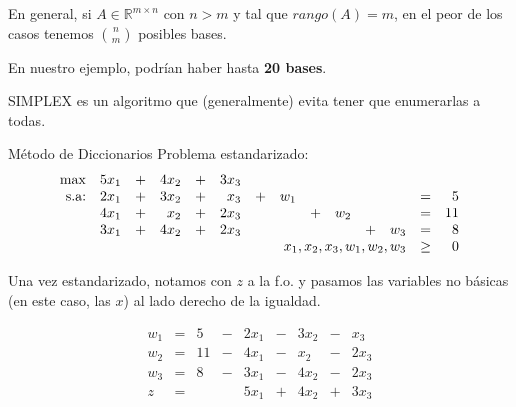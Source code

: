 \documentclass[10pt, aspectratio=169]{beamer}
\begin{document}
    \begin{frame}
        En general, si $A\in\mathbb{R}^{m\times n}$ con $n>m$ y tal que $rango(A)=m$, en el peor de los casos tenemos
        $\binom{n}{m}$ posibles bases.

        En nuestro ejemplo, podrían haber hasta \textbf{20 bases}.
        \pause

        SIMPLEX es un algoritmo que (generalmente) evita tener que enumerarlas a todas.
    \end{frame}

    \begin{frame}{Método de Diccionarios}
        Problema estandarizado:
        \vspace{0.3cm}
        \[
            \begin{array}{rrrrrrrrrrrrrr}
                \max & 5x_1 & + & 4x_2 & + & 3x_3 & \\
                \text{s.a:} & 2x_1 & + & 3x_2 & + & x_3  & + & w_1 &   &     &   &     & = & 5  \\
                & 4x_1 & + & x_2  & + & 2x_3 &   &     & + & w_2 &   &     & = & 11 \\
                & 3x_1 & + & 4x_2 & + & 2x_3 &   &     &   &     & + & w_3 & = & 8  \\
                & \multicolumn{11}{r}{x_1,x_2,x_3,w_1,w_2,w_3} & \geq & 0 \\
            \end{array}\]

        Una vez estandarizado, notamos con $z$ a la f.o. y pasamos las variables no básicas
        (en este caso, las $x$) al lado derecho de la igualdad.

        \[
            \begin{array}{rrrrrrrrr}

                w_1 & = & 5  & - & 2x_1 & - & 3x_2 & - & x_3  \\
                w_2 & = & 11 & - & 4x_1 & - & x_2  & - & 2x_3 \\
                w_3 & = & 8  & - & 3x_1 & - & 4x_2 & - & 2x_3 \\\hline
                z   & = &    &   & 5x_1 & + & 4x_2 & + & 3x_3 \\
            \end{array}
        \]
    \end{frame}
\end{document}
